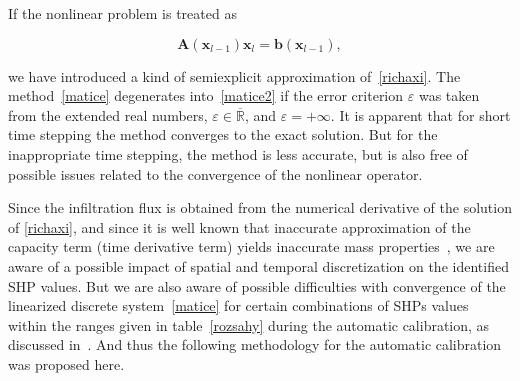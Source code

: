 \documentclass[review]{myarticle}
\newenvironment{lineq}
    {\begin{linenomath*}
    \begin{equation}
    }
    { 
    \end{equation} 
    \end{linenomath*}
    }
\renewcommand{\vec}{\mathbf}
\begin{document}
If the nonlinear problem is treated as 
\begin{lineq}
\label{matice2}
\mathbf{A}(\vec{x}_{l-1}) \vec{x}_l = \vec{b}(\vec{x}_{l-1}),
\end{lineq}
 we have introduced a kind of semiexplicit approximation  
of~\eqref{richaxi}. The method~\eqref{matice} degenerates into~\eqref{matice2} if the error criterion $\varepsilon$ was taken from the extended real numbers, $\varepsilon \in {\overline {\mathbb {R} }}$, and $\varepsilon = + \infty$. It is apparent that for short time stepping the method converges to the exact solution. But for the inappropriate time stepping, the method is less accurate, but is also free of possible issues related to the convergence of the nonlinear operator.

Since the infiltration flux is obtained from the numerical derivative of the solution of \eqref{richaxi},  and since it is well known that inaccurate approximation of the capacity term (time derivative term) yields inaccurate mass properties~\citep{celia}, we are aware of a possible impact of spatial and temporal discretization on the identified SHP values. But we are also aware of possible difficulties with convergence of the linearized discrete system~\eqref{matice} for certain combinations of SHPs values within the ranges given in table~\ref{rozsahy} during the automatic calibration, as discussed in~\cite{beven2003-uncertain}.
And thus the following methodology for the automatic calibration was proposed here.
\end{document}
